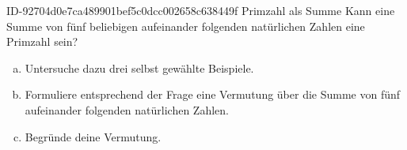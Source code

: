 \begin{exercise}
      {ID-92704d0e7ca489901bef5c0dcc002658c638449f}
      {Primzahl als Summe}
  \ifproblem\problem
    Kann eine Summe von fünf beliebigen aufeinander folgenden natürlichen
    Zahlen eine Primzahl sein?
    \begin{enumerate}[a)]
      \item Untersuche dazu drei selbst gewählte Beispiele.
      \item Formuliere entsprechend der Frage eine Vermutung über die Summe
            von fünf aufeinander folgenden natürlichen Zahlen.
      \item Begründe deine Vermutung.
    \end{enumerate}
  \fi
\end{exercise}
